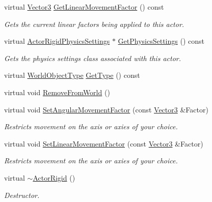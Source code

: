 \begin{DoxyCompactItemize}
virtual \hyperlink{classMezzanine_1_1Vector3}{Vector3} \hyperlink{classMezzanine_1_1ActorRigid_ac2577cc9bff31ad343d5e179acc95257}{GetLinearMovementFactor} () const 
\begin{DoxyCompactList}\small\item\em Gets the current linear factors being applied to this actor. \item\end{DoxyCompactList}\item 
virtual \hyperlink{classMezzanine_1_1ActorRigidPhysicsSettings}{ActorRigidPhysicsSettings} $\ast$ \hyperlink{classMezzanine_1_1ActorRigid_a6ed901638c88e4b9e09605152e11d56e}{GetPhysicsSettings} () const 
\begin{DoxyCompactList}\small\item\em Gets the physics settings class associated with this actor. \item\end{DoxyCompactList}\item 
virtual \hyperlink{namespaceMezzanine_a30335416fc857844e8360c84d1d1b56c}{WorldObjectType} \hyperlink{classMezzanine_1_1ActorRigid_a1369a0e640a8f0c5af9e2c2efc715121}{GetType} () const 
\item 
virtual void \hyperlink{classMezzanine_1_1ActorRigid_a5017e2809d6dc2516b3675748ce80b2e}{RemoveFromWorld} ()
\item 
virtual void \hyperlink{classMezzanine_1_1ActorRigid_ab68facc031fc3212f4169d2b93a72378}{SetAngularMovementFactor} (const \hyperlink{classMezzanine_1_1Vector3}{Vector3} \&Factor)
\begin{DoxyCompactList}\small\item\em Restricts movement on the axis or axies of your choice. \item\end{DoxyCompactList}\item 
virtual void \hyperlink{classMezzanine_1_1ActorRigid_a0dc1820d0fa2d1128b03149da025f40f}{SetLinearMovementFactor} (const \hyperlink{classMezzanine_1_1Vector3}{Vector3} \&Factor)
\begin{DoxyCompactList}\small\item\em Restricts movement on the axis or axies of your choice. \item\end{DoxyCompactList}\item 
virtual \hyperlink{classMezzanine_1_1ActorRigid_a8898e2d624ca89e3bc27dadfbc78560b}{$\sim$ActorRigid} ()
\begin{DoxyCompactList}\small\item\em Destructor. \item\end{DoxyCompactList}\end{DoxyCompactItemize}

